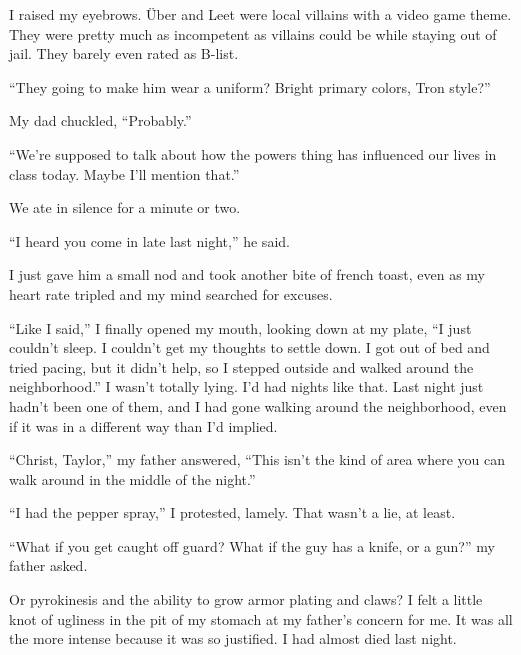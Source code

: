 I raised my eyebrows.  \"{U}ber and Leet were local villains with a video game theme.  They were pretty much as incompetent as villains could be while staying out of jail.  They barely even rated as B-list.



``They going to make him wear a uniform?  Bright primary colors, Tron style?''



My dad chuckled, ``Probably.''



``We're supposed to talk about how the powers thing has influenced our lives in class today.  Maybe I'll mention that.''



We ate in silence for a minute or two.



``I heard you come in late last night,'' he said.



I just gave him a small nod and took another bite of french toast, even as my heart rate tripled and my mind searched for excuses.



``Like I said,'' I finally opened my mouth, looking down at my plate, ``I just couldn't sleep.  I couldn't get my thoughts to settle down.  I got out of bed and tried pacing, but it didn't help, so I stepped outside and walked around the neighborhood.''  I wasn't totally lying.  I'd had nights like that.  Last night just hadn't been one of them, and I had gone walking around the neighborhood, even if it was in a different way than I'd implied.



``Christ, Taylor,'' my father answered, ``This isn't the kind of area where you can walk around in the middle of the night.''



``I had the pepper spray,'' I protested, lamely.  That wasn't a lie, at least.



``What if you get caught off guard?  What if the guy has a knife, or a gun?'' my father asked.



Or pyrokinesis and the ability to grow armor plating and claws?  I felt a little knot of ugliness in the pit of my stomach at my father's concern for me.  It was all the more intense because it was so justified.  I had almost died last night.



